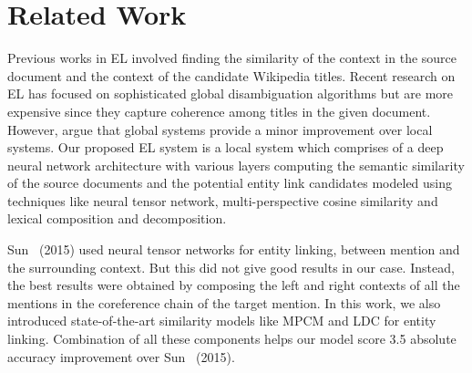 \documentclass[letterpaper]{article} \usepackage{aaai18}  \usepackage{times}  \usepackage{helvet}  \usepackage{courier}  \usepackage{url}  \usepackage{graphicx}  \frenchspacing  \setlength{\pdfpagewidth}{8.5in}  \setlength{\pdfpageheight}{11in}  \usepackage{latexsym}
\begin{document}
 \section{Related Work\label{sec:related-work} }

Previous works in EL \cite{2006-eacl-bunescu-wikipedia-ne-disambig,2007-cikm-mihalcea-wikify} involved finding the similarity of the context in the source document and the context of the candidate Wikipedia titles. Recent research
on EL has focused on sophisticated global disambiguation algorithms \cite{globerson2016collective,2008-cikm-milne-witten-wikifier,emnlp-chengroth-2013,cikm-joint-nerel} but are more expensive since they capture coherence among titles in the given document. 
However, \cite{2011-acl-illinois-wikifier} argue that global systems provide a minor improvement over local systems. Our proposed EL system is a local system which comprises of a deep neural network architecture with various layers computing the semantic similarity of the source documents and the potential entity link candidates modeled using techniques like neural tensor network, multi-perspective cosine similarity and lexical composition and decomposition.

Sun \etal\ (2015) used neural tensor networks for entity linking, between mention and the surrounding context. But this did not give good results in our case. Instead, the best results were obtained by composing the left and right contexts of all the mentions in the coreference chain of the target mention. In this work, we also introduced state-of-the-art similarity models like MPCM and LDC for entity linking. Combination of all these components helps our model score 3.5 absolute accuracy improvement over Sun \etal\ (2015).
\end{document}
